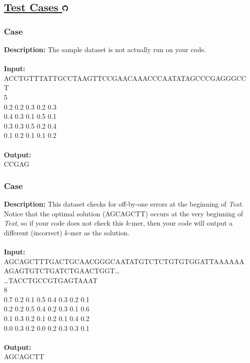 \documentclass{article}
\newcommand{\code}[1]{{\fontfamily{pcr}\selectfont #1}}
\newcommand{\gitlogo}{\includegraphics[height=12.5]{c0/gitlogo.png}}
\begin{document}
\subsection*{\href{https://github.com/rjeveloff/BA_problemregister/tree/main/test_cases/chapter_2/2C}{Test Cases \gitlogo}}
\subsubsection*{Case }
\hline \vspace{5}
\textbf{Description:} The sample dataset is not actually run on your code.\\ \\
\noindent \textbf{Input:}\\
\code{ACCTGTTTATTGCCTAAGTTCCGAACAAACCCAATATAGCCCGAGGGCCT\\5\\0.2 0.2 0.3 0.2 0.3\\0.4 0.3 0.1 0.5 0.1\\0.3 0.3 0.5 0.2 0.4\\0.1 0.2 0.1 0.1 0.2}\\ \\
\noindent \textbf{Output:}\\
\code{CCGAG}

\subsubsection*{Case }
\hline \vspace{5}
\textbf{Description:} This dataset checks for off-by-one errors at the beginning of \emph{Text}. Notice that the optimal solution (\code{AGCAGCTT}) occurs at the very beginning of \emph{Text}, so if your code does not check this $k$-mer, then your code will output a different (incorrect) $k$-mer as the solution.\\ \\
\noindent \textbf{Input:}\\
\code{AGCAGCTTTGACTGCAACGGGCAATATGTCTCTGTGTGGATTAAAAAAAGAGTGTCTGATCTGAACTGGT\dots\\
\dots TACCTGCCGTGAGTAAAT\\8\\0.7 0.2 0.1 0.5 0.4 0.3 0.2 0.1\\0.2 0.2 0.5 0.4 0.2 0.3 0.1 0.6\\0.1 0.3 0.2 0.1 0.2 0.1 0.4 0.2\\0.0 0.3 0.2 0.0 0.2 0.3 0.3 0.1}\\ \\
\noindent \textbf{Output:}\\
\code{AGCAGCTT}
\pagebreak
\end{document}
